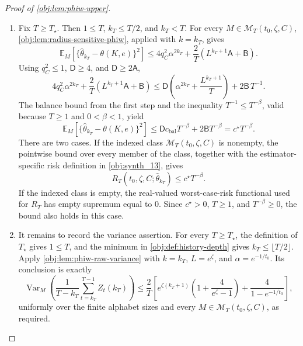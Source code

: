 \begin{proof}[Proof of \cref{obj:lem:phiw-upper}]
\begin{enumerate}
\item Fix \(T\ge T_\star\). Then \(1\le T\), \(k_T\le T/2\), and \(k_T<T\). For every
\(M\in\mathcal M_T(t_0,\zeta,C)\), \cref{obj:lem:radius-sensitive-phiw}, applied with
\(k=k_T\), gives
\[
\mathbb E_M\!\left[
\{\widehat\theta_{k_T}-\theta(K,e)\}^2
\right]
\le
4q_C^2\alpha^{2k_T}
+
\frac{2}{T}\left(L^{k_T+1}\mathsf A+\mathsf B\right).
\]
Using \(q_C^2\le1\), \(\mathsf D\ge4\), and \(\mathsf D\ge2\mathsf A\),
\[
4q_C^2\alpha^{2k_T}
+
\frac{2}{T}\left(L^{k_T+1}\mathsf A+\mathsf B\right)
\le
\mathsf D\left(\alpha^{2k_T}+\frac{L^{k_T+1}}{T}\right)
+
2\mathsf B\,T^{-1}.
\]
The balance bound from the first step and the inequality \(T^{-1}\le T^{-\beta}\), valid because
\(T\ge1\) and \(0<\beta<1\), yield
\[
\mathbb E_M\!\left[
\{\widehat\theta_{k_T}-\theta(K,e)\}^2
\right]
\le
\mathsf D c_{\mathrm{bal}}T^{-\beta}
+
2\mathsf B T^{-\beta}
=
c^\star T^{-\beta}.
\]
There are two cases. If the indexed class \(\mathcal M_T(t_0,\zeta,C)\) is nonempty, the pointwise bound over every member of the class, together with the estimator-specific risk definition in \cref{obj:synth_13}, gives
\[
R_T(t_0,\zeta,C;\widehat\theta_{k_T})
\le
c^\star T^{-\beta}.
\]
If the indexed class is empty, the real-valued worst-case-risk functional used for \(R_T\) has empty supremum equal to \(0\). Since \(c^\star>0\), \(T\ge1\), and \(T^{-\beta}\ge0\), the bound also holds in this case.

\item It remains to record the variance assertion.
For every \(T\ge T_\star\), the definition of \(T_\star\) gives \(1\le T\), and the minimum in \cref{obj:def:history-depth} gives
\(k_T\le\lfloor T/2\rfloor\).  Apply \cref{obj:lem:phiw-raw-variance} with
\(k=k_T\), \(L=e^\zeta\), and \(\alpha=e^{-1/t_0}\).  Its conclusion is exactly
\[
\operatorname{Var}_M\!\left(
\frac1{T-k_T}\sum_{t=k_T}^{T-1}Z_t(k_T)
\right)
\le
\frac{2}{T}\left[
e^{\zeta(k_T+1)}\left(1+\frac{4}{e^\zeta-1}\right)
+\frac{4}{1-e^{-1/t_0}}
\right],
\]
uniformly over the finite alphabet sizes and every
\(M\in\mathcal M_T(t_0,\zeta,C)\), as required.
\end{enumerate}
\end{proof}
